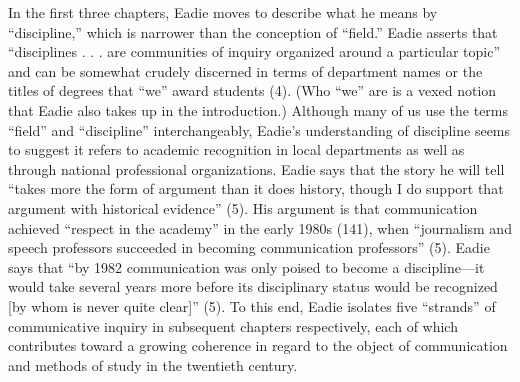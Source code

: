 \documentclass{tufte-handout}
\begin{document}
In the first three chapters, Eadie moves to describe what he means by
``discipline,'' which is narrower than the conception of ``field.''
Eadie asserts that ``disciplines . . . are communities of inquiry
organized around a particular topic'' and can be somewhat crudely
discerned in terms of department names or the titles of degrees that
``we'' award students (4). (Who ``we'' are is a vexed notion that Eadie
also takes up in the introduction.) Although many of us use the terms
``field'' and ``discipline'' interchangeably, Eadie's understanding of
discipline seems to suggest it refers to academic recognition in local
departments as well as through national professional organizations.
Eadie says that the story he will tell ``takes more the form of argument
than it does history, though I do support that argument with historical
evidence'' (5). His argument is that communication achieved ``respect in
the academy'' in the early 1980s (141), when ``journalism and speech
professors succeeded in becoming communication professors'' (5). Eadie
says that ``by 1982 communication was only poised to become a
discipline---it would take several years more before its disciplinary
status would be recognized {[}by whom is never quite clear{]}'' (5). To
this end, Eadie isolates five ``strands'' of communicative inquiry in
subsequent chapters respectively, each of which contributes toward a
growing coherence in regard to the object of communication and methods
of study in the twentieth century.
\end{document}
